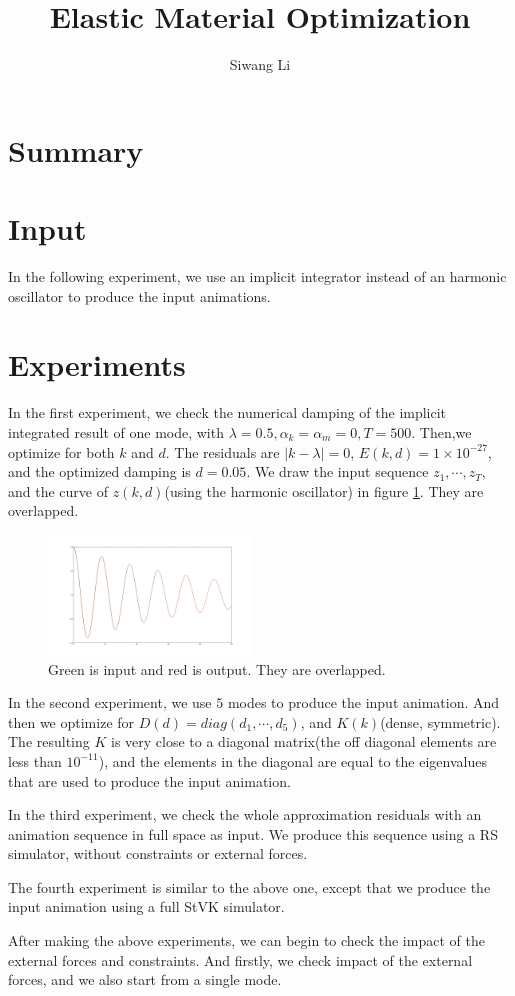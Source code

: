 \documentclass[twocolumn,a4paper]{article}
\author{Siwang Li}
\title{Elastic Material Optimization}
\begin{document}
\maketitle

\section{Summary}


\section{Input} 
In the following experiment, we use an implicit integrator instead of an
harmonic oscillator to produce the input animations.

\section{Experiments}
In the first experiment, we check the numerical damping of the implicit
integrated result of one mode, with
$\lambda=0.5,\alpha_k=\alpha_m=0,T=500$. Then,we optimize for both $k$ and
$d$. The residuals are $|k-\lambda|=0$, $E(k,d)=1\times 10^{-27}$, and the
optimized damping is $d=0.05$. We draw the input sequence $z_1,\cdots,z_T$, and
the curve of $z(k,d)$(using the harmonic oscillator) in figure
\ref{onemode}. They are overlapped.
\begin{figure}
  \centering
  \includegraphics[width=0.48\textwidth]{figures/singleModeDK_imp.png}
  \caption{Green is input and red is output. They are overlapped.}
  \label{onemode}
\end{figure}

In the second experiment, we use $5$ modes to produce the input animation. And
then we optimize for $D(d)=diag(d_1,\cdots,d_5)$, and $K(k)$(dense,
symmetric). The resulting $K$ is very close to a diagonal matrix(the off
diagonal elements are less than $10^{-11}$), and the elements in the diagonal
are equal to the eigenvalues that are used to produce the input animation.

In the third experiment, we check the whole approximation residuals with an
animation sequence in full space as input. We produce this sequence using a RS
simulator, without constraints or external forces.

The fourth experiment is similar to the above one, except that we produce the
input animation using a full StVK simulator.

After making the above experiments, we can begin to check the impact of the
external forces and constraints. And firstly, we check impact of the external
forces, and we also start from a single mode.
\end{document}
